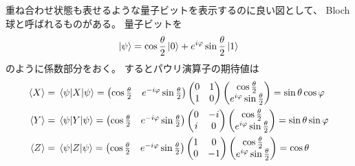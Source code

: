 \documentclass[../master.tex]{subfiles}
\begin{document}
重ね合わせ状態も表せるような量子ビットを表示するのに良い図として、
Bloch球と呼ばれるものがある。
量子ビットを
\begin{equation}\begin{aligned}[b]
    \ket{\psi}=\cos\frac{\theta}{2}\ket{0}+e^{i\varphi}\sin\frac{\theta}{2}\ket{1}
\end{aligned}\end{equation}
のように係数部分をおく。
するとパウリ演算子の期待値は
\begin{equation}\begin{aligned}[b]
    \ev{X} &= \mel{\psi}{X}{\psi}=
        \begin{pmatrix}
            \cos\frac{\theta}{2} & e^{-i\varphi}\sin\frac{\theta}{2}
        \end{pmatrix}
        \begin{pmatrix}
            0 & 1\\
            1 & 0
        \end{pmatrix}
        \begin{pmatrix}
            \cos\frac{\theta}{2}\\e^{i\varphi}\sin\frac{\theta}{2}
        \end{pmatrix}
        =\sin\theta\cos\varphi\\
    \ev{Y} &= \mel{\psi}{Y}{\psi}=
        \begin{pmatrix}
            \cos\frac{\theta}{2} & e^{-i\varphi}\sin\frac{\theta}{2}
        \end{pmatrix}
        \begin{pmatrix}
            0 & -i\\
            i & 0
        \end{pmatrix}
        \begin{pmatrix}
            \cos\frac{\theta}{2}\\e^{i\varphi}\sin\frac{\theta}{2}
        \end{pmatrix}
        =\sin\theta\sin\varphi\\
    \ev{Z} &= \mel{\psi}{Z}{\psi}=
        \begin{pmatrix}
            \cos\frac{\theta}{2} & e^{-i\varphi}\sin\frac{\theta}{2}
        \end{pmatrix}
        \begin{pmatrix}
            1 & 0\\
            0 & -1
        \end{pmatrix}
        \begin{pmatrix}
            \cos\frac{\theta}{2}\\e^{i\varphi}\sin\frac{\theta}{2}
        \end{pmatrix}
        =\cos\theta
\end{aligned}\end{equation}
\end{document}
